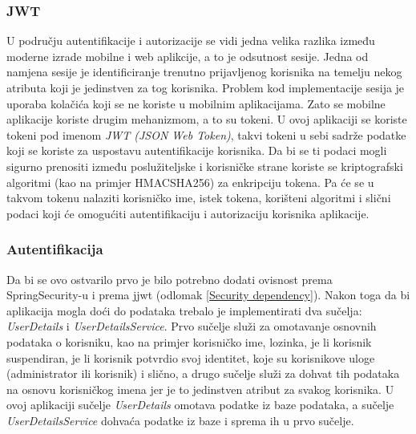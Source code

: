 \documentclass[times, utf8, zavrsni]{fer}
\begin{document}
\subsubsection{JWT}
U području autentifikacije i autorizacije se vidi jedna velika razlika između
moderne izrade mobilne i web aplikcije, a to je odsutnost sesije. Jedna od namjena sesije je
identificiranje trenutno prijavljenog korisnika na temelju nekog atributa koji je jedinstven za tog korisnika.
Problem kod implementacije sesija je uporaba kolačića koji se ne koriste u mobilnim aplikacijama.
Zato se mobilne aplikacije koriste drugim mehanizmom, a
to su tokeni. U ovoj aplikaciji se koriste tokeni pod imenom \textit{JWT (JSON Web Token)}, takvi tokeni
u sebi sadrže podatke koji se koriste za uspostavu autentifikacije korisnika. Da bi se ti podaci
mogli sigurno prenositi između poslužiteljske i korisničke strane koriste se
kriptografski algoritmi (kao na primjer HMACSHA256) za enkripciju tokena.
Pa će se u takvom tokenu nalaziti korisničko ime, istek tokena, korišteni algoritmi i slični podaci koji će omogućiti
autentifikaciju i autorizaciju korisnika aplikacije.

\subsubsection{Autentifikacija}
Da bi se ovo ostvarilo prvo je bilo potrebno dodati ovisnost prema \linebreak
SpringSecurity-u i prema jjwt (odlomak \ref{Security dependency}). Nakon toga da bi aplikacija mogla doći do podataka trebalo je implementirati dva sučelja:
\textit{UserDetails} i \textit{UserDetailsService}. Prvo sučelje služi za omotavanje osnovnih podataka o korisniku,
kao na primjer korisničko ime, lozinka, je li korisnik suspendiran, je li korisnik potvrdio svoj identitet,
koje su korisnikove uloge (administrator ili korisnik) i slično,
a drugo sučelje služi za dohvat tih podataka na osnovu korisničkog imena jer je to jedinstven atribut za svakog korisnika.
U ovoj aplikaciji sučelje \textit{UserDetails} omotava
podatke iz baze podataka, a sučelje \textit{UserDetailsService} dohvaća podatke iz baze i sprema ih u prvo sučelje.
\end{document}
